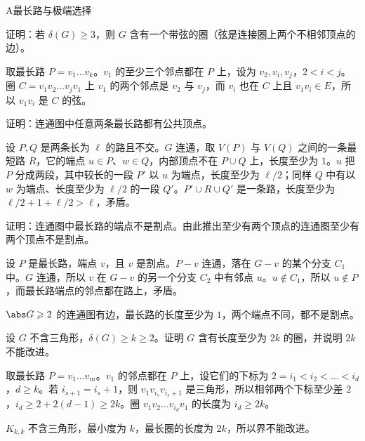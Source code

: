 \begin{exercises}{A}{最长路与极端选择}
\item\label{ex:longest-paths:A1} 证明：若 $\delta(G)\geqslant3$，则 $G$ 含有一个带弦的圈（弦是连接圈上两个不相邻顶点的边）。
\begin{solution}
取最长路 $P=v_1\dots v_k$。$v_1$ 的至少三个邻点都在 $P$ 上，设为 $v_2,v_i,v_j$，$2<i<j$。圈 $C=v_1v_2\dots v_jv_1$ 上 $v_1$ 的两个邻点是 $v_2$ 与 $v_j$，而 $v_i$ 也在 $C$ 上且 $v_1v_i\in E$，所以 $v_1v_i$ 是 $C$ 的弦。
\end{solution}

\item\label{ex:longest-paths:A2} 证明：连通图中任意两条最长路都有公共顶点。
\begin{solution}
设 $P,Q$ 是两条长为 $\ell$ 的路且不交。$G$ 连通，取 $V(P)$ 与 $V(Q)$ 之间的一条最短路 $R$，它的端点 $u\in P$、$w\in Q$，内部顶点不在 $P\cup Q$ 上，长度至少为 $1$。$u$ 把 $P$ 分成两段，其中较长的一段 $P'$ 以 $u$ 为端点，长度至少为 $\ell/2$；同样 $Q$ 中有以 $w$ 为端点、长度至少为 $\ell/2$ 的一段 $Q'$。$P'\cup R\cup Q'$ 是一条路，长度至少为 $\ell/2+1+\ell/2>\ell$，矛盾。
\end{solution}

\item\label{ex:longest-paths:A3} 证明：连通图中最长路的端点不是割点。由此推出至少有两个顶点的连通图至少有两个顶点不是割点。
\begin{solution}
设 $P$ 是最长路，端点 $v$，且 $v$ 是割点。$P-v$ 连通，落在 $G-v$ 的某个分支 $C_1$ 中。$G$ 连通，所以 $v$ 在 $G-v$ 的另一个分支 $C_2$ 中有邻点 $u$。$u\notin C_1$，所以 $u\notin P$，而最长路端点的邻点都在路上，矛盾。

$\abs G\geqslant2$ 的连通图有边，最长路的长度至少为 $1$，两个端点不同，都不是割点。
\end{solution}

\item\label{ex:longest-paths:A4} 设 $G$ 不含三角形，$\delta(G)\geqslant k\geqslant2$。证明 $G$ 含有长度至少为 $2k$ 的圈，并说明 $2k$ 不能改进。
\begin{solution}
取最长路 $P=v_1\dots v_m$。$v_1$ 的邻点都在 $P$ 上，设它们的下标为 $2=i_1<i_2<\dots<i_d$，$d\geqslant k$。若 $i_{s+1}=i_s+1$，则 $v_1v_{i_s}v_{i_s+1}$ 是三角形，所以相邻两个下标至少差 $2$，$i_d\geqslant2+2(d-1)\geqslant2k$。圈 $v_1v_2\dots v_{i_d}v_1$ 的长度为 $i_d\geqslant2k$。

$K_{k,k}$ 不含三角形，最小度为 $k$，最长圈的长度为 $2k$，所以界不能改进。
\end{solution}
\end{exercises}

